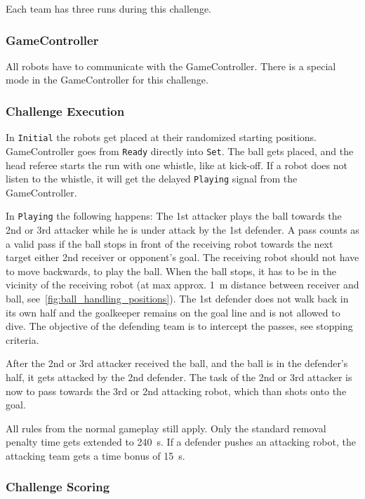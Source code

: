     Each team has three runs during this challenge.

    \subsubsection{GameController}
        All robots have to communicate with the GameController. There is a special mode in the GameController for this challenge.

    \subsubsection{Challenge Execution}

        In \texttt{Initial} the robots get placed at their randomized starting positions. GameController goes from \texttt{Ready} directly into \texttt{Set}. The ball gets placed, and the head referee starts the run with one whistle, like at kick-off. If a robot does not listen to the whistle, it will get the delayed \texttt{Playing} signal from the GameController.

        In \texttt{Playing} the following happens: The 1st attacker plays the ball towards the 2nd or 3rd attacker while he is under attack by the 1st defender.
        A pass counts as a valid pass if the ball stops in front of the receiving robot towards the next target either 2nd receiver or opponent's goal. The receiving robot should not have to move backwards, to play the ball. When the ball stops, it has to be in the vicinity of the receiving robot (at max approx. \qty{1}{\metre} distance between receiver and ball, see~\cref{fig:ball_handling_positions}).
        The 1st defender does not walk back in its own half and the goalkeeper remains on the goal line and is not allowed to dive. The objective of the defending team is to intercept the passes, see stopping criteria.

        After the 2nd or 3rd attacker received the ball, and the ball is in the defender's half, it gets attacked by the 2nd defender. The task of the 2nd or 3rd attacker is now to pass towards the 3rd or 2nd attacking robot, which than shots onto the goal.

        All rules from the normal gameplay still apply. Only the standard removal penalty time gets extended to \qty{240}{\second}. 
        If a defender pushes an attacking robot, the attacking team gets a time bonus of \qty{15}{\second}.

    \subsubsection{Challenge Scoring}

